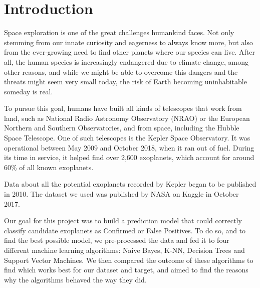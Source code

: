 
\section{Introduction}%
\label{sec:intro}
Space exploration is one of the great challenges humankind faces. Not only stemming
from our innate curiosity and eagerness to always know more, but also from the
ever-growing need to find other planets where our species can live. After all,
the human species is increasingly endangered due to climate change, among other
reasons, and while we might be able to overcome this dangers and the
threats might seem very small today, the risk of Earth becoming 
uninhabitable someday is real.

To pursue this goal, humans have built all kinds of telescopes that work from
land, such as National Radio Astronomy Observatory (NRAO) or the European
Northern and Southern Observatories, and from space, including the Hubble
Space Telescope. One of such telescopes is the Kepler Space Observatory. It was 
operational between May 2009 and October 2018, when it ran out of fuel.
During its time in service, it helped find over 2,600 exoplanets, which account
for around 60\% of all known exoplanets.

Data about all the potential exoplanets recorded by Kepler began to be published
in 2010. The dataset we used was published by NASA on Kaggle in October 2017.

Our goal for this project was to build a prediction model that could correctly 
classify candidate exoplanets as Confirmed or False Positives. To do so,
and to find the best possible model, we pre-processed the data and fed it to
four different machine learning
algorithms: Naive Bayes, K-NN, Decision Trees and Support Vector Machines. We
then compared the outcome of these algorithms to find which
works best for our dataset and target, and aimed to find the reasons
why the algorithms behaved the way they did.